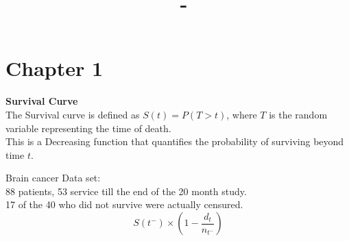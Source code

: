 \documentclass[answers,12pt,addpoints]{exam}
\author{\name}
\title{\course \ - \assignment}
\begin{document}
\maketitle


\newpage
\section*{Chapter 1}
\textbf{Survival Curve}\\
The Survival curve is defined as $S(t) = P(T > t)$, where $T$ is the random variable representing the time of death.\\
This is a Decreasing function that quantifies the probability of surviving beyond time $t$.
\begin{example}
    Brain cancer Data set:\\
    88 patients, 53 service till the end of the 20 month study.\\
    17 of the 40 who did not survive were actually censured.\\
    $$S(t^-) \times (1-\frac{d_t}{n_{t^-}}) $$
\end{example}
\end{document}
